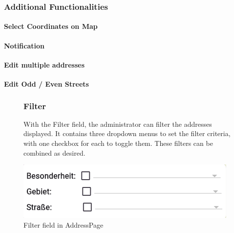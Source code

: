 \subsubsection{Additional Functionalities}

\paragraph{Select Coordinates on Map}

\paragraph{Notification}

\paragraph{Edit multiple addresses}

\paragraph{Edit Odd / Even Streets}


\begin{figure}[H]
    \centering
    \begin{minipage}{0.55\textwidth} %
        \subsubsection{Filter}
        With the Filter field, the administrator can filter the addresses displayed. It contains three dropdown menus to set the filter criteria, with one checkbox for each to toggle them. These filters can be combined as desired. 
    \end{minipage}
    \hfill 
    \begin{minipage}{0.4\textwidth} %
        \centering
        \includegraphics[width=\linewidth]{images/AdminPanel/FilterField.png}
        \caption{Filter field in AddressPage}
        \label{fig:adminpanel_filter}
    \end{minipage}
\end{figure}

